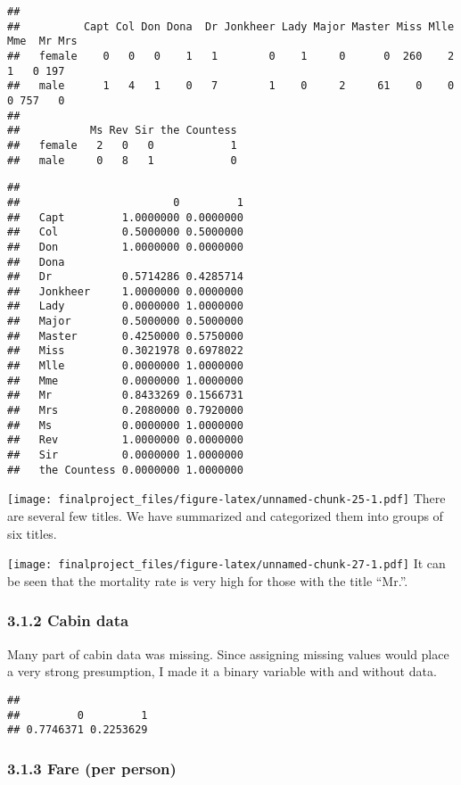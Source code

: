 \documentclass[
]{article}
\begin{document}
\begin{verbatim}
##         
##          Capt Col Don Dona  Dr Jonkheer Lady Major Master Miss Mlle Mme  Mr Mrs
##   female    0   0   0    1   1        0    1     0      0  260    2   1   0 197
##   male      1   4   1    0   7        1    0     2     61    0    0   0 757   0
##         
##           Ms Rev Sir the Countess
##   female   2   0   0            1
##   male     0   8   1            0
\end{verbatim}

\begin{verbatim}
##               
##                        0         1
##   Capt         1.0000000 0.0000000
##   Col          0.5000000 0.5000000
##   Don          1.0000000 0.0000000
##   Dona                            
##   Dr           0.5714286 0.4285714
##   Jonkheer     1.0000000 0.0000000
##   Lady         0.0000000 1.0000000
##   Major        0.5000000 0.5000000
##   Master       0.4250000 0.5750000
##   Miss         0.3021978 0.6978022
##   Mlle         0.0000000 1.0000000
##   Mme          0.0000000 1.0000000
##   Mr           0.8433269 0.1566731
##   Mrs          0.2080000 0.7920000
##   Ms           0.0000000 1.0000000
##   Rev          1.0000000 0.0000000
##   Sir          0.0000000 1.0000000
##   the Countess 0.0000000 1.0000000
\end{verbatim}

\texttt{[image: finalproject\_files/figure-latex/unnamed-chunk-25-1.pdf]}
There are several few titles. We have summarized and categorized them
into groups of six titles.

\texttt{[image: finalproject\_files/figure-latex/unnamed-chunk-27-1.pdf]}
It can be seen that the mortality rate is very high for those with the
title ``Mr.''.

\hypertarget{cabin-data}{%
\subsubsection{\texorpdfstring{\textbf{3.1.2 Cabin
data}}{3.1.2 Cabin data}}\label{cabin-data}}

Many part of cabin data was missing. Since assigning missing values
would place a very strong presumption, I made it a binary variable with
and without data.

\begin{verbatim}
## 
##         0         1 
## 0.7746371 0.2253629
\end{verbatim}

\hypertarget{fare-per-person}{%
\subsubsection{\texorpdfstring{\textbf{3.1.3 Fare (per
person)}}{3.1.3 Fare (per person)}}\label{fare-per-person}}
\end{document}

